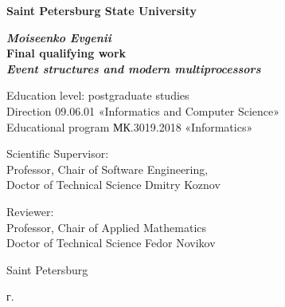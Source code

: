 \restoregeometry
\addtocounter{page}{1}



\begin{titlepage}
\begin{center}

\textbf{Saint Petersburg State University}

\vspace{35mm}

\textbf{\textit{\large Moiseenko Evgenii}} \\[8mm]
\textbf{\large Final qualifying work}\\[3mm]
\textbf{\textit{\large Event structures and modern multiprocessors}}

\vspace{20mm}
Education level: postgraduate studies \\
Direction 09.06.01 «Informatics and Computer Science»\\
Educational program МК.3019.2018 «Informatics»\\

\vspace{15mm}

\begin{flushright}
\begin{minipage}[t]{0.7\textwidth}
{Scientific Supervisor:} \\
Professor, Chair of Software Engineering, \\ Doctor of Technical Science Dmitry Koznov

\vspace{10mm}

{Reviewer:} \\
Professor, Chair of Applied Mathematics \\ Doctor of Technical Science Fedor Novikov 
\end{minipage}
\end{flushright}

\vfill 

{Saint Petersburg}
\par{\the\year{} г.}
\end{center}
\end{titlepage}
\restoregeometry
\addtocounter{page}{2}


